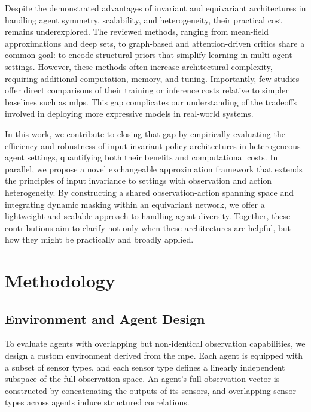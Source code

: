 \documentclass{article}
\begin{document}
Despite the demonstrated advantages of invariant and equivariant architectures in handling 
agent symmetry, scalability, and heterogeneity, their practical cost remains underexplored. 
The reviewed methods, ranging from mean-field approximations and deep sets, 
to graph-based and attention-driven critics share a common goal: to encode 
structural priors that simplify learning in multi-agent settings. However, 
these methods often increase architectural complexity, requiring additional computation, 
memory, and tuning. Importantly, few studies offer direct comparisons of their 
training or inference costs relative to simpler baselines such as \glspl{mlp}. 
This gap complicates our understanding of the tradeoffs involved in deploying 
more expressive models in real-world systems.

In this work, we contribute to closing that gap by empirically evaluating the efficiency 
and robustness of input-invariant policy architectures in heterogeneous-agent settings, 
quantifying both their benefits and computational costs. In parallel, we 
propose a novel exchangeable approximation framework that extends the principles 
of input invariance to settings with observation and action heterogeneity. 
By constructing a shared observation-action spanning space and integrating dynamic 
masking within an equivariant network, we offer a lightweight and scalable 
approach to handling agent diversity. Together, these contributions aim to 
clarify not only when these architectures are helpful, 
but how they might be practically and broadly applied.


\section{Methodology}
\label{con2:sec:methodology}

\subsection{Environment and Agent Design}

To evaluate agents with overlapping but non-identical observation capabilities, 
we design a custom environment derived from the \gls{mpe}. 
Each agent is equipped with a subset of sensor types, 
and each sensor type defines a linearly independent subspace of the 
full observation space. An agent's full observation vector is constructed by 
concatenating the outputs of its sensors, and overlapping sensor types across 
agents induce structured correlations.
\end{document}
